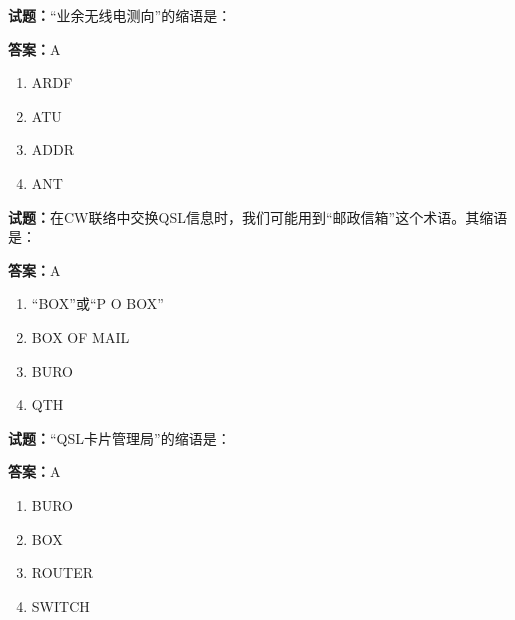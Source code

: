 \documentclass{ctexbook}
\begin{document}




\vspace{1em}

\textbf{试题：}“业余无线电测向”的缩语是： 


\textbf{答案：}A 

\begin{enumerate}[leftmargin=3em]
  \item ARDF 

  \item ATU 

  \item ADDR 

  \item ANT 

\end{enumerate}





\vspace{1em}

\textbf{试题：}在CW联络中交换QSL信息时，我们可能用到“邮政信箱”这个术语。其缩语是： 

\textbf{答案：}A 

\begin{enumerate}[leftmargin=3em]
  \item “BOX”或“P O BOX” 

  \item BOX OF MAIL 

  \item BURO 

  \item QTH 

\end{enumerate}





\vspace{1em}

\textbf{试题：}“QSL卡片管理局”的缩语是： 

\textbf{答案：}A 

\begin{enumerate}[leftmargin=3em]
  \item BURO 

  \item BOX 

  \item ROUTER 

  \item SWITCH 

\end{enumerate}
\end{document}
